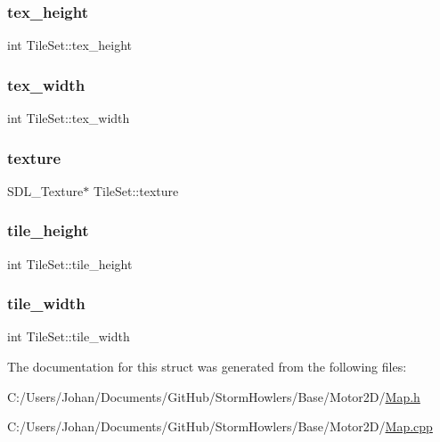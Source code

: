 \mbox{\label{struct_tile_set_acf8af81366b4c96abb65d3f5888f58c6}} 
\subsubsection{\texorpdfstring{tex\_height}{tex\_height}}
{\footnotesize\ttfamily int Tile\+Set\+::tex\+\_\+height}

\mbox{\label{struct_tile_set_ad8e015c97882be372764235b85255429}} 
\subsubsection{\texorpdfstring{tex\_width}{tex\_width}}
{\footnotesize\ttfamily int Tile\+Set\+::tex\+\_\+width}

\mbox{\label{struct_tile_set_aac93506fa4de016ba671fd2c326f0e87}} 
\subsubsection{\texorpdfstring{texture}{texture}}
{\footnotesize\ttfamily S\+D\+L\+\_\+\+Texture$\ast$ Tile\+Set\+::texture}

\mbox{\label{struct_tile_set_a96acf501a3a3062f112f8efb1c188f73}} 
\subsubsection{\texorpdfstring{tile\_height}{tile\_height}}
{\footnotesize\ttfamily int Tile\+Set\+::tile\+\_\+height}

\mbox{\label{struct_tile_set_a5eef007cf9f62a3cf923fa487429e1fe}} 
\subsubsection{\texorpdfstring{tile\_width}{tile\_width}}
{\footnotesize\ttfamily int Tile\+Set\+::tile\+\_\+width}



The documentation for this struct was generated from the following files\+:\begin{DoxyCompactItemize}
\item 
C\+:/\+Users/\+Johan/\+Documents/\+Git\+Hub/\+Storm\+Howlers/\+Base/\+Motor2\+D/\mbox{\hyperlink{_map_8h}{Map.\+h}}\item 
C\+:/\+Users/\+Johan/\+Documents/\+Git\+Hub/\+Storm\+Howlers/\+Base/\+Motor2\+D/\mbox{\hyperlink{_map_8cpp}{Map.\+cpp}}\end{DoxyCompactItemize}
